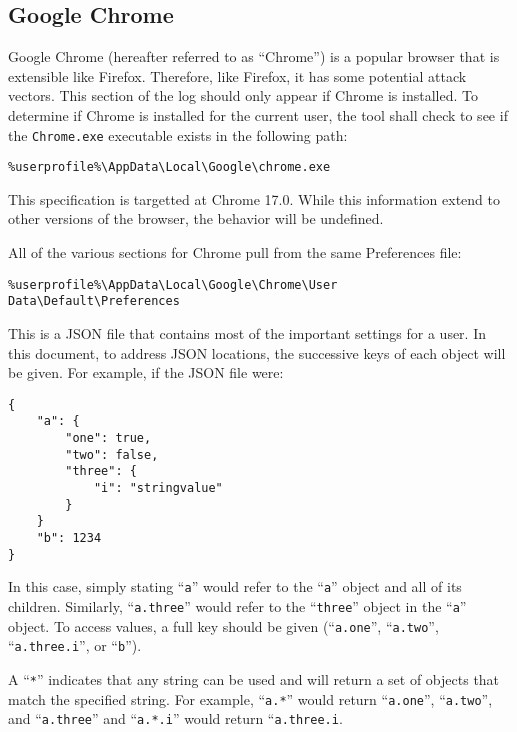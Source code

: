 \subsection{Google Chrome}
Google Chrome (hereafter referred to as ``Chrome'') is a popular browser that is
extensible like Firefox.  Therefore, like Firefox, it has some potential attack
vectors.  This section of the log should only appear if Chrome is installed.  To
determine if Chrome is installed for the current user, the tool shall check to
see if the \texttt{Chrome.exe} executable exists in the following path:
\begin{verbatim}
%userprofile%\AppData\Local\Google\chrome.exe
\end{verbatim}
This specification is targetted at Chrome 17.0.  While this information extend
to other versions of the browser, the behavior will be undefined.  

All of the various sections for Chrome pull from the same Preferences file:
\begin{verbatim}
%userprofile%\AppData\Local\Google\Chrome\User Data\Default\Preferences
\end{verbatim}
This is a JSON file that contains most of the important settings for a user.  In
this document, to address JSON locations, the successive keys of each object
will be given.  For example, if the JSON file were:
\begin{verbatim}
{
    "a": {
        "one": true,
        "two": false,
        "three": {
            "i": "stringvalue"
        }
    }
    "b": 1234
}
\end{verbatim}
In this case, simply stating ``\texttt{a}'' would refer to the ``\texttt{a}''
object and all of its children.  Similarly, ``\texttt{a.three}'' would refer to
the ``\texttt{three}'' object in the ``\texttt{a}'' object.  To access values,
a full key should be given (``\texttt{a.one}'', ``\texttt{a.two}'',
``\texttt{a.three.i}'', or ``\texttt{b}'').  

A ``\texttt{*}'' indicates that any string can be used and will return a set of
objects that match the specified string.  For example, ``\texttt{a.*}'' would
return ``\texttt{a.one}'', ``\texttt{a.two}'', and ``\texttt{a.three}'' and
``\texttt{a.*.i}'' would return ``\texttt{a.three.i}.

